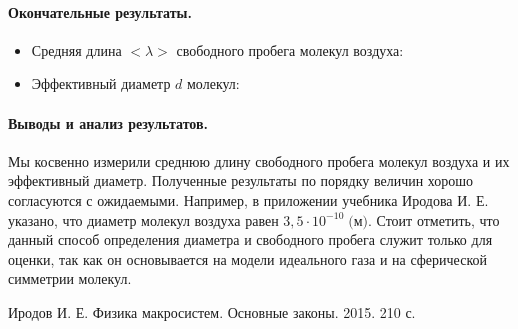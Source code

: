 \documentclass{article}
\begin{document}
\paragraph{Окончательные результаты.}
\begin{itemize}
	\item Средняя длина $<\lambda>$ свободного пробега молекул воздуха:
	\begin{center}
	\end{center}
	
	\item Эффективный диаметр $d$ молекул:
	\begin{center}
	\end{center}

\end{itemize}

\paragraph{Выводы и анализ результатов.}
Мы косвенно измерили среднюю длину свободного пробега молекул воздуха и их эффективный диаметр. Полученные результаты по порядку величин хорошо согласуются с ожидаемыми. Например, в приложении учебника Иродова И. Е.~\cite{1} указано, что диаметр молекул воздуха  равен $3,5\cdot10^{-10}\; \mbox{(м)}$. Стоит отметить, что данный способ определения диаметра и свободного пробега служит только для оценки, так как он основывается на модели идеального газа и на сферической симметрии молекул.

\begin{thebibliography}{3}
	Иродов И. Е. Физика макросистем. Основные законы. 2015. 210 с.
\end{thebibliography}
\end{document}
